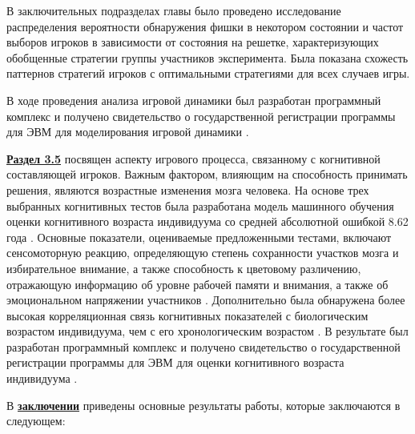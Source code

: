 В заключительных подразделах главы было проведено исследование распределения вероятности обнаружения фишки в некотором состоянии и частот выборов игроков в зависимости от состояния на решетке, характеризующих обобщенные стратегии группы участников эксперимента. Была показана схожесть паттернов стратегий игроков с оптимальными стратегиями для всех случаев игры.

В ходе проведения анализа игровой динамики был разработан программный комплекс и получено свидетельство о государственной регистрации программы для ЭВМ для моделирования игровой динамики \cite{progbib1}.

\underline{\textbf{Раздел 3.5}} посвящен аспекту игрового процесса, связанному с когнитивной составляющей игроков. Важным фактором, влияющим на способность принимать решения, являются возрастные изменения мозга человека. На основе трех выбранных когнитивных тестов была разработана модель машинного обучения оценки когнитивного возраста индивидуума со средней абсолютной ошибкой 8.62 года \cite{bib4}. Основные показатели, оцениваемые предложенными тестами, включают сенсомоторную реакцию, определяющую степень сохранности участков мозга и избирательное внимание, а также способность к цветовому различению, отражающую информацию об уровне рабочей памяти и внимания, а также об эмоциональном напряжении участников \cite{confbib2}. Дополнительно была обнаружена более высокая корреляционная связь когнитивных показателей с биологическим возрастом индивидуума, чем с его хронологическим возрастом \cite{confbib3}. В результате был разработан программный комплекс и получено свидетельство о государственной регистрации программы для ЭВМ для оценки когнитивного возраста индивидуума \cite{progbib2}.


\FloatBarrier
{}                                  %
В \underline{\textbf{заключении}} приведены основные результаты работы, которые заключаются в следующем:



